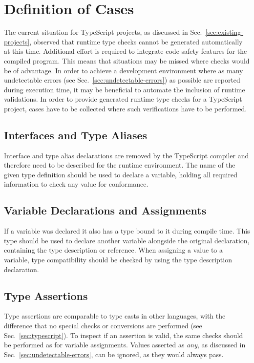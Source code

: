 \section{Definition of Cases}
\label{sec:type-check-situations}

The current situation for TypeScript projects, as discussed in Sec.~\ref{sec:existing-projects}, observed that runtime type checks cannot be generated automatically at this time. Additional effort is required to integrate code safety features for the compiled program. This means that situations may be missed where checks would be of advantage. In order to achieve a development environment where as many undetectable errors (see Sec.~\ref{sec:undetectable-errors}) as possible are reported during execution time, it may be beneficial to automate the inclusion of runtime validations. In order to provide generated runtime type checks for a TypeScript project, cases have to be collected where such verifications have to be performed.

\subsection{Interfaces and Type Aliases}

Interface and type alias declarations are removed by the TypeScript compiler and therefore need to be described for the runtime environment. The name of the given type definition should be used to declare a variable, holding all required information to check any value for conformance.

\subsection{Variable Declarations and Assignments}

If a variable was declared it also has a type bound to it during compile time. This type should be used to declare another variable alongside the original declaration, containing the type description or reference. When assigning a value to a variable, type compatibility should be checked by using the type description declaration.

\subsection{Type Assertions}

Type assertions are comparable to type casts in other languages, with the difference that no special checks or conversions are performed (see Sec.~\ref{sec:typescript}). To inspect if an assertion is valid, the same checks should be performed as for variable assignments. Values asserted as \emph{any}, as discussed in Sec.~\ref{sec:undetectable-errors}, can be ignored, as they would always pass.

